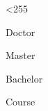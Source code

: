 
\makeatletter
{}
\loop \catcode{} \ifnum\@tempcnta<255 \advance \@tempcnta \@ne
\repeat
\makeatother

\newif\ifxueweidoctor %
\newif\ifxueweimaster
\newif\ifxueweibachelor
\newif\ifxueweicourse
\newif\ifNeedEnAbstract
\newif\ifNeedCoverOne
\newif\ifNeedAppendix

\def\temp{Doctor}
\ifx\temp\xuewei
  \xueweidoctortrue
  \xueweimasterfalse
  \xueweibachelorfalse
  \xueweicoursefalse
  \NeedEnAbstracttrue
  \NeedCoverOnetrue
  \NeedAppendixtrue
\fi

\def\temp{Master}
\ifx\temp\xuewei
  \xueweidoctorfalse
  \xueweimastertrue
  \xueweibachelorfalse
  \xueweicoursefalse
  \NeedEnAbstracttrue
  \NeedCoverOnetrue
  \NeedAppendixtrue
\fi

\def\temp{Bachelor}
\ifx\temp\xuewei
  \xueweidoctorfalse  
  \xueweimasterfalse  
  \xueweibachelortrue
  \xueweicoursefalse
  \NeedEnAbstracttrue
  \NeedCoverOnetrue
  \NeedAppendixtrue
\fi

\def\temp{Course}
\ifx\temp\xuewei	
  \xueweidoctorfalse  
  \xueweimasterfalse  
  \xueweibachelorfalse
  \xueweicoursetrue
  \NeedEnAbstractfalse
  \NeedCoverOnefalse
  \NeedAppendixfalse
\fi

\ifxueweidoctor
  \newcommand{\cxuewei}{博士学位}
  \newcommand{\exuewei}{Doctor}
  \newcommand{\exueweier}{Doctoral}
  \newcommand{\xueweishort}{博士}
\fi

\ifxueweimaster
  \newcommand{\cxuewei}{硕士学位}
  \newcommand{\exuewei}{Master}
  \newcommand{\exueweier}{Master's}
  \newcommand{\xueweishort}{硕士}
\fi

\ifxueweibachelor
  \newcommand{\cxuewei}{本科学位}
  \newcommand{\exuewei}{Bachelor}
  \newcommand{\exueweier}{Bachelor's}
  \newcommand{\xueweishort}{学士}
\fi

\ifxueweicourse
  \newcommand{\cxuewei}{课程设计}
  \newcommand{\exuewei}{Course}
  \newcommand{\exueweier}{Course's}
  \newcommand{\xueweishort}{课程}
\fi
